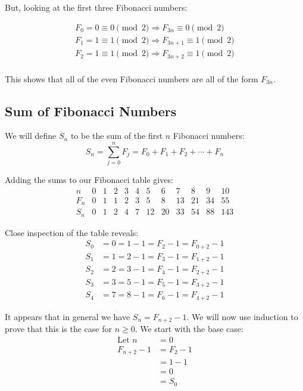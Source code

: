 \documentclass{article}
\begin{document}
But, looking at the first three Fibonacci numbers:

\[\begin{aligned}
    F_0 = 0 \equiv 0 \pmod 2 \Rightarrow F_{3n} \equiv 0 \pmod 2 \\
    F_1 = 1 \equiv 1 \pmod 2 \Rightarrow F_{3n+1} \equiv 1 \pmod 2 \\
    F_2 = 1 \equiv 1 \pmod 2 \Rightarrow F_{3n+2} \equiv 1 \pmod 2 \\
\end{aligned}\]

This shows that all of the even Fibonacci numbers are all of the form
\(F_{3n}\).

\subsection*{Sum of Fibonacci Numbers}
We will define \(S_n\) to be the sum of the first \(n\) Fibonacci numbers:
\[ S_n = \sum_{j=0}^n F_j = F_0 + F_1 + F_2 + \cdots + F_n \]

Adding the sums to our Fibonacci table gives:
\[\begin{array}{r|ccccccccccc}
    n & 0 & 1 & 2 & 3 & 4 & 5 & 6 & 7 & 8 & 9 & 10 \\
    \hline
    F_n & 0 & 1 & 1 & 2 & 3 & 5 & 8 & 13 & 21 & 34 & 55 \\
    \hline
    S_n & 0 & 1 & 2 & 4 & 7 & 12 & 20 & 33 & 54 & 88 & 143
\end{array}\]

Close inspection of the table reveals:
\[\begin{aligned}
    S_0 &= 0 = 1 - 1 = F_2 - 1 = F_{0+2} - 1 \\
    S_1 &= 1 = 2 - 1 = F_3 - 1 = F_{1+2} - 1 \\
    S_2 &= 2 = 3 - 1 = F_4 - 1 = F_{2+2} - 1 \\
    S_3 &= 3 = 5 - 1 = F_5 - 1 = F_{3+2} - 1 \\
    S_4 &= 7 = 8 - 1 = F_6 - 1 = F_{4+2} - 1
\end{aligned}\]

It appears that in general we have \(S_n=F_{n+2}-1\). We will now use induction
to prove that this is the case for \(n \geq 0\). We start with the base case:
\[\begin{aligned}
    \text{Let } n &= 0 \\
    F_{n+2} - 1 &= F_2 - 1 \\
    &= 1 - 1 \\
    &= 0 \\
    &= S_0
\end{aligned}\]
\end{document}
